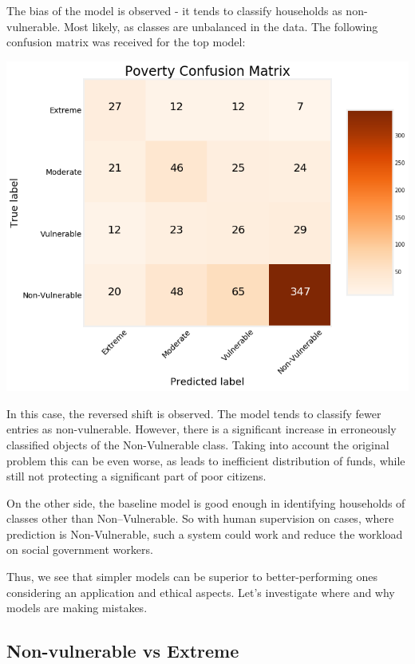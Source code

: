     The bias of the model is observed - it tends to classify households as non-vulnerable. Most likely, as classes are unbalanced in the data.
    The following confusion matrix was received for the top model:
    \begin{center}
        \includegraphics[width=\textwidth]{images/confusion_matrix_lgbm.png}
    \end{center}


    In this case, the reversed shift is observed. The model tends to classify fewer entries as non-vulnerable. However, there is a significant increase in erroneously classified objects of the Non-Vulnerable class. Taking into account the original problem this can be even worse, as leads to inefficient distribution of funds, while still not protecting a significant part of poor citizens.
    
    On the other side, the baseline model is good enough in identifying households of classes other than Non--Vulnerable. So with human supervision on cases, where prediction is Non-Vulnerable, such a system could work and reduce the workload on social government workers.
    
    Thus, we see that simpler models can be superior to better-performing ones considering an application and ethical aspects. Let’s investigate where and why models are making mistakes.
    
    \subsection{Non-vulnerable vs Extreme}

